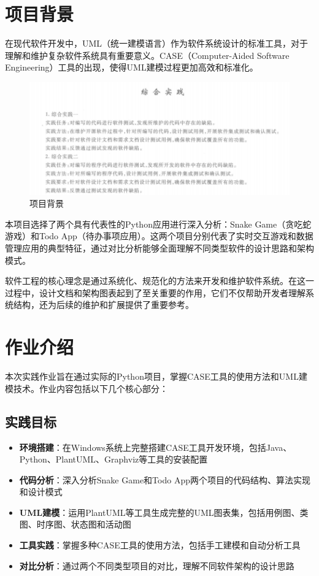 \documentclass[a4paper]{article}
\begin{document}
\section{项目背景}

在现代软件开发中，UML（统一建模语言）作为软件系统设计的标准工具，对于理解和维护复杂软件系统具有重要意义。CASE（Computer-Aided Software Engineering）工具的出现，使得UML建模过程更加高效和标准化。

\begin{figure}[H]
\centering
\includegraphics[width=\textwidth]{img/1.png}
\caption{项目背景}
\label{fig:project_overview}
\end{figure}

本项目选择了两个具有代表性的Python应用进行深入分析：Snake Game（贪吃蛇游戏）和Todo App（待办事项应用）。这两个项目分别代表了实时交互游戏和数据管理应用的典型特征，通过对比分析能够全面理解不同类型软件的设计思路和架构模式。

软件工程的核心理念是通过系统化、规范化的方法来开发和维护软件系统。在这一过程中，设计文档和架构图表起到了至关重要的作用，它们不仅帮助开发者理解系统结构，还为后续的维护和扩展提供了重要参考。

\section{作业介绍}

本次实践作业旨在通过实际的Python项目，掌握CASE工具的使用方法和UML建模技术。作业内容包括以下几个核心部分：

\subsection{实践目标}

\begin{itemize}
    \item \textbf{环境搭建}：在Windows系统上完整搭建CASE工具开发环境，包括Java、Python、PlantUML、Graphviz等工具的安装配置
    \item \textbf{代码分析}：深入分析Snake Game和Todo App两个项目的代码结构、算法实现和设计模式
    \item \textbf{UML建模}：运用PlantUML等工具生成完整的UML图表集，包括用例图、类图、时序图、状态图和活动图
    \item \textbf{工具实践}：掌握多种CASE工具的使用方法，包括手工建模和自动分析工具
    \item \textbf{对比分析}：通过两个不同类型项目的对比，理解不同软件架构的设计思路
\end{itemize}
\end{document}
